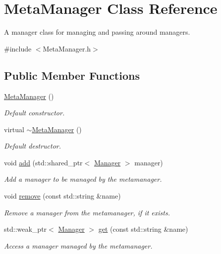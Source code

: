 \hypertarget{class_meta_manager}{}\section{Meta\+Manager Class Reference}
\label{class_meta_manager}


A manager class for managing and passing around managers.  




{\ttfamily \#include $<$Meta\+Manager.\+h$>$}

\subsection*{Public Member Functions}
\begin{DoxyCompactItemize}
\item 
\hyperlink{class_meta_manager_a7f75a78a1470d64c7e3caf41644061c5}{Meta\+Manager} ()
\begin{DoxyCompactList}\small\item\em Default constructor. \end{DoxyCompactList}\item 
virtual \hyperlink{class_meta_manager_ad0b66bed6144ddc320d2c5930046ab73}{$\sim$\+Meta\+Manager} ()
\begin{DoxyCompactList}\small\item\em Default destructor. \end{DoxyCompactList}\item 
void \hyperlink{class_meta_manager_a3b1c68062b4591c10a5fbcb1550e50d6}{add} (std\+::shared\+\_\+ptr$<$ \hyperlink{class_manager}{Manager} $>$ manager)
\begin{DoxyCompactList}\small\item\em Add a manager to be managed by the metamanager. \end{DoxyCompactList}\item 
void \hyperlink{class_meta_manager_a3de340f9eec8f318b53088f7633e68cd}{remove} (const std\+::string \&name)
\begin{DoxyCompactList}\small\item\em Remove a manager from the metamanager, if it exists. \end{DoxyCompactList}\item 
std\+::weak\+\_\+ptr$<$ \hyperlink{class_manager}{Manager} $>$ \hyperlink{class_meta_manager_a7e2c87f000842d51f835a9831a950332}{get} (const std\+::string \&name)
\begin{DoxyCompactList}\small\item\em Access a manager managed by the metamanager. \end{DoxyCompactList}\end{DoxyCompactItemize}
